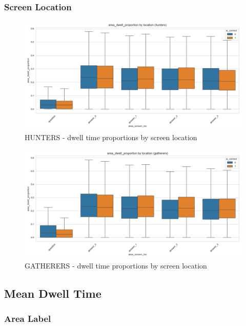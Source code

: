 \documentclass{article}
\begin{document}
\subsubsection{Screen Location}

\begin{figure}[H]
    \centering
    \includegraphics[width=0.8\linewidth]{plots/boxplots/boxplot_area_screen_loc_area_dwell_proportion_hunters.png}
    \caption{HUNTERS - dwell time proportions by screen location}
    \label{fig:dp_hunt_sl}
\end{figure}

\begin{figure}[H]
    \centering
    \includegraphics[width=0.8\linewidth]{plots/boxplots/boxplot_area_screen_loc_area_dwell_proportion_gatherers.png}
    \caption{GATHERERS - dwell time proportions by screen location}
    \label{fig:dp_gath_sl}
\end{figure}


\subsection{Mean Dwell Time}
\subsubsection{Area Label}
\end{document}
